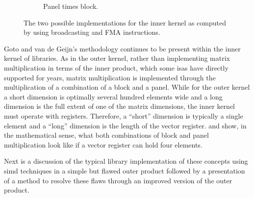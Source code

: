 \documentclass[\main/thesis.tex]{subfiles}
\begin{document}
\begin{figure}[t]
\begin{subfigure}{.45\linewidth}
    \caption{Panel times block.}
    \label{fig:gepbSimd}
  \end{subfigure}
  \hfill
  \caption[Inner Kernel Implementations, In Register]{The two possible implementations for the inner kernel as computed by using broadcasting and FMA instructions.}
  \label{fig:gepb}
  \vspace{-0.15cm}
\end{figure}

Goto and van de Geijn's methodology continues to be present within the inner kernel of libraries.
As in the outer kernel, rather than implementing matrix multiplication in terms of the inner product, which some \glspl{isa} have directly supported for years\footnotemark, matrix multiplication is implemented through the multiplication of a combination of a block and a panel.
While for the outer kernel a short dimension is optimally several hundred elements wide and a long dimension is the full extent of one of the matrix dimensions, the inner kernel must operate with registers.
Therefore, a ``short'' dimension is typically a single element and a ``long'' dimension is the length of the vector register.
 and  show, in the mathematical sense, what both combinations of block and panel multiplication look like if a vector register can hold four elements.

Next is a discussion of the typical library implementation of these concepts using \gls{simd} techniques in a simple but flawed outer product followed by a presentation of a method to resolve these flaws through an improved version of the outer product.
\end{document}
